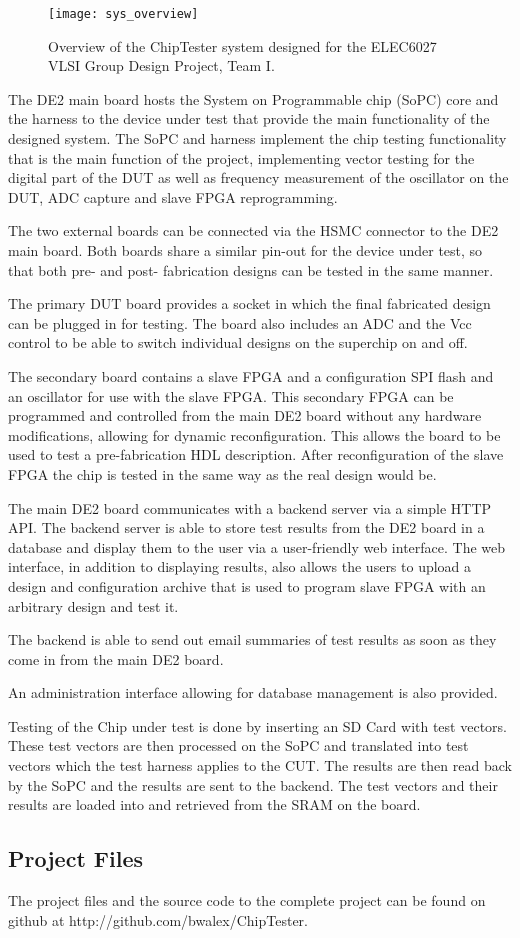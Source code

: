 \begin{figure}[h!]
\centering
\texttt{[image: sys\_overview]}
\caption{Overview of the ChipTester system designed for the ELEC6027 VLSI Group Design Project, Team I.}
\label{fig:intro_sys_overview}
\end{figure}


The DE2 main board hosts the System on Programmable chip (SoPC) core and the harness to
the device under test that provide the main functionality of
the designed system. The SoPC and harness implement
the chip testing functionality that is the main function of the project, implementing
vector testing for the digital part of the DUT as well as frequency measurement of
the oscillator on the DUT, ADC capture and slave FPGA reprogramming.

The two external boards can be connected via the HSMC connector to the DE2 main board.
Both boards share a similar pin-out for the device under test, so that both pre- and post-
fabrication designs can be tested in the same manner.

The primary DUT board provides a socket in which the final fabricated design can
be plugged in for testing. The board also includes an ADC and the Vcc control to be
able to switch individual designs on the superchip on and off.

The secondary board contains a slave FPGA and a configuration SPI flash and an oscillator for
use with the slave FPGA. This secondary FPGA can be programmed and controlled from the
main DE2 board without any hardware modifications, allowing for dynamic reconfiguration.
This allows the board to be used to test a pre-fabrication HDL description.
After reconfiguration of the slave FPGA the chip is tested in the same way as the real
design would be.

The main DE2 board communicates with a backend server via a simple HTTP API. The
backend server is able to store test results from the DE2 board in a database and
display them to the user via a user-friendly web interface. The web interface,
in addition to displaying results, also allows the users to upload a design and configuration
archive that is used to program slave FPGA with an arbitrary design and test it.

The backend is able to send out email summaries of test results as soon as they
come in from the main DE2 board.

An administration interface allowing for database management is also provided.

Testing of the Chip under test is done by inserting an SD Card with test vectors.
These test vectors are then processed on the SoPC and translated into test vectors
which the test harness applies to the CUT. The results are then read back by
the SoPC and the results are sent to the backend. The test vectors and their results
are loaded into and retrieved from the SRAM on the board.



\subsection{Project Files}
The project files and the source code to the complete project can be found
on github at http://github.com/bwalex/ChipTester.




